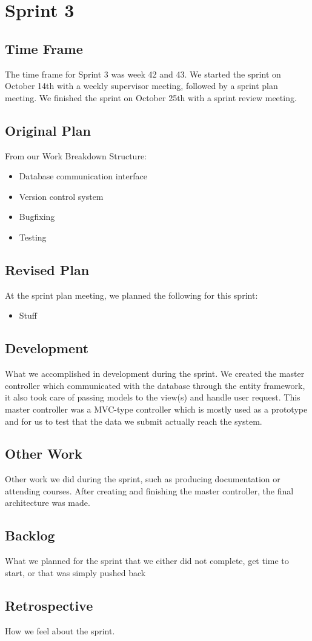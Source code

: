 \section{Sprint 3}

\subsection{Time Frame}
The time frame for Sprint 3 was week 42 and 43. We started the sprint on October 14th with a weekly supervisor meeting, followed by a sprint plan meeting. We finished the sprint on October 25th with a sprint review meeting.

\subsection{Original Plan}
From our Work Breakdown Structure:
\begin{itemize}
	\item Database communication interface
	\item Version control system
	\item Bugfixing
	\item Testing
\end{itemize}

\subsection{Revised Plan}
At the sprint plan meeting, we planned the following for this sprint:
\begin{itemize}
	\item Stuff
\end{itemize}

\subsection{Development}
What we accomplished in development during the sprint.
We created the master controller which communicated with the database through the entity framework, it also took care of passing models to the view(s) and handle user request. This master controller was a MVC-type controller which is mostly used as a prototype and for us to test that the data we submit actually reach the system.

\subsection{Other Work}
Other work we did during the sprint, such as producing documentation or attending courses.
After creating and finishing the master controller, the final architecture was made.

\subsection{Backlog}
What we planned for the sprint that we either did not complete, get time to start, or that was simply pushed back

\subsection{Retrospective}
How we feel about the sprint.